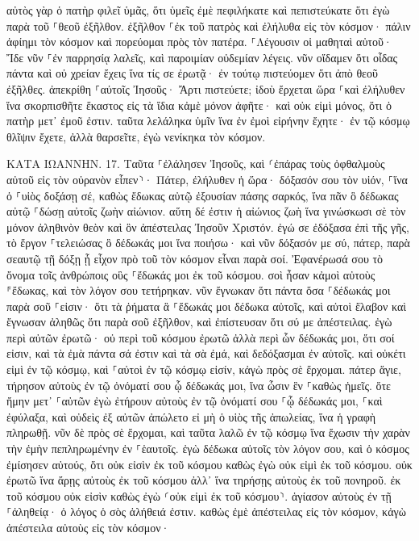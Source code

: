\documentclass[twoside, 9pt]{extreport}
\begin{document}
αὐτὸς γὰρ ὁ πατὴρ φιλεῖ ὑμᾶς, ὅτι ὑμεῖς ἐμὲ πεφιλήκατε καὶ πεπιστεύκατε ὅτι ἐγὼ παρὰ τοῦ ⸀θεοῦ ἐξῆλθον. 
ἐξῆλθον ⸀ἐκ τοῦ πατρὸς καὶ ἐλήλυθα εἰς τὸν κόσμον· πάλιν ἀφίημι τὸν κόσμον καὶ πορεύομαι πρὸς τὸν πατέρα. 
⸀Λέγουσιν οἱ μαθηταὶ αὐτοῦ· Ἴδε νῦν ⸀ἐν παρρησίᾳ λαλεῖς, καὶ παροιμίαν οὐδεμίαν λέγεις. 
νῦν οἴδαμεν ὅτι οἶδας πάντα καὶ οὐ χρείαν ἔχεις ἵνα τίς σε ἐρωτᾷ· ἐν τούτῳ πιστεύομεν ὅτι ἀπὸ θεοῦ ἐξῆλθες. 
ἀπεκρίθη ⸀αὐτοῖς Ἰησοῦς· Ἄρτι πιστεύετε; 
ἰδοὺ ἔρχεται ὥρα ⸀καὶ ἐλήλυθεν ἵνα σκορπισθῆτε ἕκαστος εἰς τὰ ἴδια κἀμὲ μόνον ἀφῆτε· καὶ οὐκ εἰμὶ μόνος, ὅτι ὁ πατὴρ μετ᾽ ἐμοῦ ἐστιν. 
ταῦτα λελάληκα ὑμῖν ἵνα ἐν ἐμοὶ εἰρήνην ἔχητε· ἐν τῷ κόσμῳ θλῖψιν ἔχετε, ἀλλὰ θαρσεῖτε, ἐγὼ νενίκηκα τὸν κόσμον. 

ΚΑΤΑ ΙΩΑΝΝΗΝ.
17.
Ταῦτα ⸀ἐλάλησεν Ἰησοῦς, καὶ ⸂ἐπάρας τοὺς ὀφθαλμοὺς αὐτοῦ εἰς τὸν οὐρανὸν εἶπεν⸃· Πάτερ, ἐλήλυθεν ἡ ὥρα· δόξασόν σου τὸν υἱόν, ⸀ἵνα ὁ ⸀υἱὸς δοξάσῃ σέ, 
καθὼς ἔδωκας αὐτῷ ἐξουσίαν πάσης σαρκός, ἵνα πᾶν ὃ δέδωκας αὐτῷ ⸀δώσῃ αὐτοῖς ζωὴν αἰώνιον. 
αὕτη δέ ἐστιν ἡ αἰώνιος ζωὴ ἵνα γινώσκωσι σὲ τὸν μόνον ἀληθινὸν θεὸν καὶ ὃν ἀπέστειλας Ἰησοῦν Χριστόν. 
ἐγώ σε ἐδόξασα ἐπὶ τῆς γῆς, τὸ ἔργον ⸀τελειώσας ὃ δέδωκάς μοι ἵνα ποιήσω· 
καὶ νῦν δόξασόν με σύ, πάτερ, παρὰ σεαυτῷ τῇ δόξῃ ᾗ εἶχον πρὸ τοῦ τὸν κόσμον εἶναι παρὰ σοί. 
Ἐφανέρωσά σου τὸ ὄνομα τοῖς ἀνθρώποις οὓς ⸀ἔδωκάς μοι ἐκ τοῦ κόσμου. σοὶ ἦσαν κἀμοὶ αὐτοὺς ⸁ἔδωκας, καὶ τὸν λόγον σου τετήρηκαν. 
νῦν ἔγνωκαν ὅτι πάντα ὅσα ⸀δέδωκάς μοι παρὰ σοῦ ⸀εἰσιν· 
ὅτι τὰ ῥήματα ἃ ⸀ἔδωκάς μοι δέδωκα αὐτοῖς, καὶ αὐτοὶ ἔλαβον καὶ ἔγνωσαν ἀληθῶς ὅτι παρὰ σοῦ ἐξῆλθον, καὶ ἐπίστευσαν ὅτι σύ με ἀπέστειλας. 
ἐγὼ περὶ αὐτῶν ἐρωτῶ· οὐ περὶ τοῦ κόσμου ἐρωτῶ ἀλλὰ περὶ ὧν δέδωκάς μοι, ὅτι σοί εἰσιν, 
καὶ τὰ ἐμὰ πάντα σά ἐστιν καὶ τὰ σὰ ἐμά, καὶ δεδόξασμαι ἐν αὐτοῖς. 
καὶ οὐκέτι εἰμὶ ἐν τῷ κόσμῳ, καὶ ⸀αὐτοὶ ἐν τῷ κόσμῳ εἰσίν, κἀγὼ πρὸς σὲ ἔρχομαι. πάτερ ἅγιε, τήρησον αὐτοὺς ἐν τῷ ὀνόματί σου ᾧ δέδωκάς μοι, ἵνα ὦσιν ἓν ⸀καθὼς ἡμεῖς. 
ὅτε ἤμην μετ᾽ ⸀αὐτῶν ἐγὼ ἐτήρουν αὐτοὺς ἐν τῷ ὀνόματί σου ⸀ᾧ δέδωκάς μοι, ⸀καὶ ἐφύλαξα, καὶ οὐδεὶς ἐξ αὐτῶν ἀπώλετο εἰ μὴ ὁ υἱὸς τῆς ἀπωλείας, ἵνα ἡ γραφὴ πληρωθῇ. 
νῦν δὲ πρὸς σὲ ἔρχομαι, καὶ ταῦτα λαλῶ ἐν τῷ κόσμῳ ἵνα ἔχωσιν τὴν χαρὰν τὴν ἐμὴν πεπληρωμένην ἐν ⸀ἑαυτοῖς. 
ἐγὼ δέδωκα αὐτοῖς τὸν λόγον σου, καὶ ὁ κόσμος ἐμίσησεν αὐτούς, ὅτι οὐκ εἰσὶν ἐκ τοῦ κόσμου καθὼς ἐγὼ οὐκ εἰμὶ ἐκ τοῦ κόσμου. 
οὐκ ἐρωτῶ ἵνα ἄρῃς αὐτοὺς ἐκ τοῦ κόσμου ἀλλ᾽ ἵνα τηρήσῃς αὐτοὺς ἐκ τοῦ πονηροῦ. 
ἐκ τοῦ κόσμου οὐκ εἰσὶν καθὼς ἐγὼ ⸂οὐκ εἰμὶ ἐκ τοῦ κόσμου⸃. 
ἁγίασον αὐτοὺς ἐν τῇ ⸀ἀληθείᾳ· ὁ λόγος ὁ σὸς ἀλήθειά ἐστιν. 
καθὼς ἐμὲ ἀπέστειλας εἰς τὸν κόσμον, κἀγὼ ἀπέστειλα αὐτοὺς εἰς τὸν κόσμον· 
\end{document}
